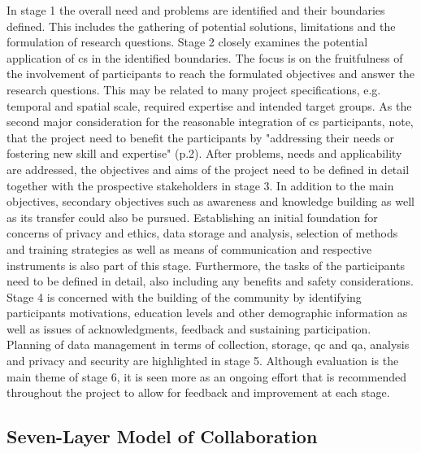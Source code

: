 In stage 1 the overall need and problems are identified and their boundaries defined. This includes the gathering of potential solutions, limitations and the formulation of research questions. Stage 2 closely examines the potential application of \acrshort{cs} in the identified boundaries. The focus is on the fruitfulness of the involvement of participants to reach the formulated objectives and answer the research questions. This may be related to many project specifications, e.g. temporal and spatial scale, required expertise and intended target groups. As the second major consideration for the reasonable integration of \acrshort{cs} participants, \textcite{fraislCitizenScienceEnvironmental2022} note, that the project need to benefit the participants by "addressing their needs or fostering new skill and expertise" (p.2). After problems, needs and applicability are addressed, the objectives and aims of the project need to be defined in detail together with the prospective stakeholders in stage 3. In addition to the main objectives, secondary objectives such as awareness and knowledge building as well as its transfer could also be pursued. Establishing an initial foundation for concerns of privacy and ethics, data storage and analysis, selection of methods and training strategies as well as means of communication and respective instruments is also part of this stage. Furthermore, the tasks of the participants need to be defined in detail, also including any benefits and safety considerations. Stage 4 is concerned with the building of the community by identifying participants motivations, education levels and other demographic information as well as issues of acknowledgments, feedback and sustaining participation. Planning of data management in terms of collection, storage, \acrfull{qc} and \acrfull{qa}, analysis and privacy and security are highlighted in stage 5. Although evaluation is the main theme of stage 6, it is seen more as an ongoing effort that is recommended throughout the project to allow for feedback and improvement at each stage.

\subsection{Seven-Layer Model of Collaboration}\label{subsec:slmc}

